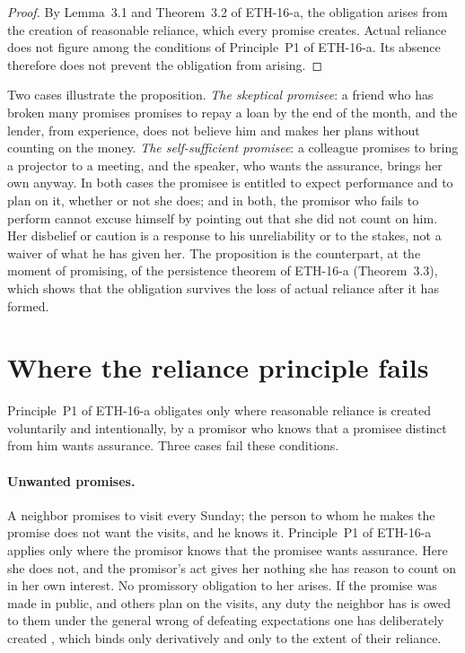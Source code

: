 \documentclass{situationist-preprint}
\begin{document}
\begin{proof}
By Lemma~3.1 and Theorem~3.2 of ETH-16-a, the obligation arises from the creation of reasonable reliance, which every promise creates. Actual reliance does not figure among the conditions of Principle~P1 of ETH-16-a. Its absence therefore does not prevent the obligation from arising.
\end{proof}

Two cases illustrate the proposition. \emph{The skeptical promisee}: a friend who has broken many promises promises to repay a loan by the end of the month, and the lender, from experience, does not believe him and makes her plans without counting on the money. \emph{The self-sufficient promisee}: a colleague promises to bring a projector to a meeting, and the speaker, who wants the assurance, brings her own anyway. In both cases the promisee is entitled to expect performance and to plan on it, whether or not she does; and in both, the promisor who fails to perform cannot excuse himself by pointing out that she did not count on him. Her disbelief or caution is a response to his unreliability or to the stakes, not a waiver of what he has given her. The proposition is the counterpart, at the moment of promising, of the persistence theorem of ETH-16-a (Theorem~3.3), which shows that the obligation survives the loss of actual reliance after it has formed.

\section{Where the reliance principle fails}

Principle~P1 of ETH-16-a obligates only where reasonable reliance is created voluntarily and intentionally, by a promisor who knows that a promisee distinct from him wants assurance. Three cases fail these conditions.

\paragraph{Unwanted promises.} A neighbor promises to visit every Sunday; the person to whom he makes the promise does not want the visits, and he knows it. Principle~P1 of ETH-16-a applies only where the promisor knows that the promisee wants assurance. Here she does not, and the promisor's act gives her nothing she has reason to count on in her own interest. No promissory obligation to her arises. If the promise was made in public, and others plan on the visits, any duty the neighbor has is owed to them under the general wrong of defeating expectations one has deliberately created \citep{Scanlon1998}, which binds only derivatively and only to the extent of their reliance.
\end{document}
